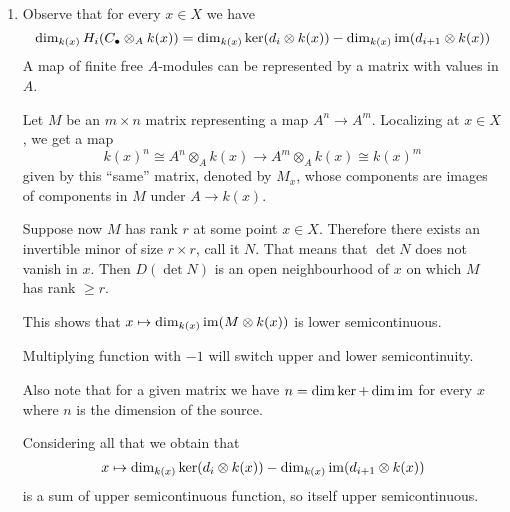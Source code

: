 \begin{exercise}{2}
    \begin{enumerate}[label=(\roman*)]
        \item{
                Observe that for every $x \in X$ we have
                \begin{equation*}
                    \dim_{k(x)} H_i(C_\bullet \otimes_A k(x)) = \dim_{k(x)} \ker
                    (d_i \otimes k(x)) - \dim_{k(x)} \operatorname{im} (d_{i+1} \otimes k(x))
                \end{equation*}
                A map of finite free $A$-modules can be represented by a matrix
                with values in $A$.

                Let $M$ be an $m \times n$ matrix representing a map $A^n \to
                A^m$. Localizing at $x \in X$, we get a map
                \begin{equation*}
                    k(x)^n \cong A^n \otimes_A k(x) \to A^m \otimes_A k(x) \cong
                    k(x)^m
                \end{equation*}
                given by this ``same'' matrix, denoted by $M_x$, whose
                components are images of components in $M$ under $A \to k(x)$.
                
                Suppose now $M$ has rank $r$ at some point $x \in X$.
                Therefore there exists an invertible minor of size $r
                \times r$, call it $N$. That means that $\det N$ does not vanish in $x$.
                Then $D(\det N)$ is an open neighbourhood of $x$ on which $M$ has rank $\geq r$.

                This shows that $x \mapsto \dim_{k(x)} \operatorname{im}(M \otimes k(x))$ is
                lower semicontinuous.

                Multiplying function with $-1$ will switch upper and lower
                semicontinuity.

                Also note that for a given matrix we have $n = \dim \ker + \dim
                \operatorname{im}$ for every $x$ where $n$ is the dimension of the source.

                Considering all that we obtain that
                \begin{equation*}
                    x \mapsto \dim_{k(x)} \ker (d_i \otimes k(x)) - \dim_{k(x)} \operatorname{im}
                    (d_{i+1} \otimes k(x))
                \end{equation*}
                is a sum of upper semicontinuous function, so itself upper semicontinuous.
            }


\end{enumerate}
\end{exercise}
